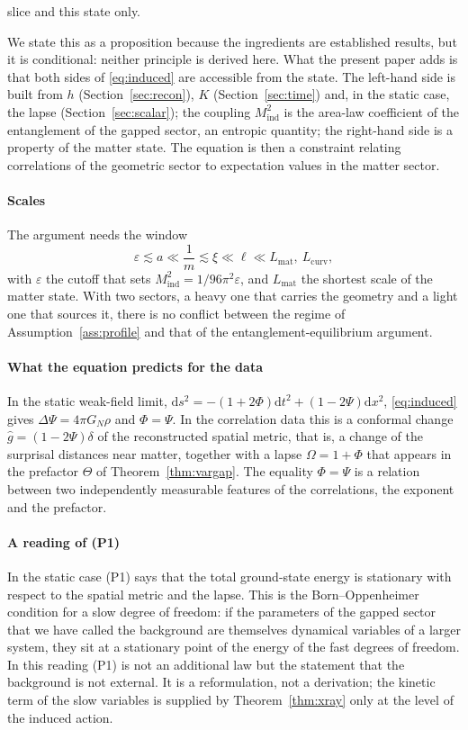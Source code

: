 \documentclass[11pt,a4paper]{article}
\theoremstyle{stmt}
\theoremstyle{defn}
\theoremstyle{rmk}
\numberwithin{equation}{section}
\newcommand{\dd}{\mathrm{d}}
\newcommand{\Lcurv}{L_{\mathrm{curv}}}
\begin{document}
slice and this state only.

We state this as a proposition because the ingredients are established results, but it is conditional: neither principle is derived here. What the present paper adds is that both sides of \eqref{eq:induced} are accessible from the state. The left-hand side is built from $h$ (Section~\ref{sec:recon}), $K$ (Section~\ref{sec:time}) and, in the static case, the lapse (Section~\ref{sec:scalar}); the coupling $M_{\mathrm{ind}}^2$ is the area-law coefficient of the entanglement of the gapped sector, an entropic quantity; the right-hand side is a property of the matter state. The equation is then a constraint relating correlations of the geometric sector to expectation values in the matter sector.

\paragraph{Scales} The argument needs the window
\begin{equation}
\varepsilon\lesssim a\ll\frac1m\lesssim\xi\ll\ell\ll L_{\mathrm{mat}},\ \Lcurv ,
\end{equation}
with $\varepsilon$ the cutoff that sets $M_{\mathrm{ind}}^2=1/96\pi^2\varepsilon$, and $L_{\mathrm{mat}}$ the shortest scale of the matter state. With two sectors, a heavy one that carries the geometry and a light one that sources it, there is no conflict between the regime of Assumption~\ref{ass:profile} and that of the entanglement-equilibrium argument.

\paragraph{What the equation predicts for the data} In the static weak-field limit, $\dd s^2=-(1+2\Phi)\dd t^2+(1-2\Psi)\dd x^2$, \eqref{eq:induced} gives $\Delta\Psi=4\pi G_N\rho$ and $\Phi=\Psi$. In the correlation data this is a conformal change $\hat g=(1-2\Psi)\delta$ of the reconstructed spatial metric, that is, a change of the surprisal distances near matter, together with a lapse $\Omega=1+\Phi$ that appears in the prefactor $\Theta$ of Theorem~\ref{thm:vargap}. The equality $\Phi=\Psi$ is a relation between two independently measurable features of the correlations, the exponent and the prefactor.

\paragraph{A reading of (P1)} In the static case (P1) says that the total ground-state energy is stationary with respect to the spatial metric and the lapse. This is the Born--Oppenheimer condition for a slow degree of freedom: if the parameters of the gapped sector that we have called the background are themselves dynamical variables of a larger system, they sit at a stationary point of the energy of the fast degrees of freedom. In this reading (P1) is not an additional law but the statement that the background is not external. It is a reformulation, not a derivation; the kinetic term of the slow variables is supplied by Theorem~\ref{thm:xray} only at the level of the induced action.
\end{document}
